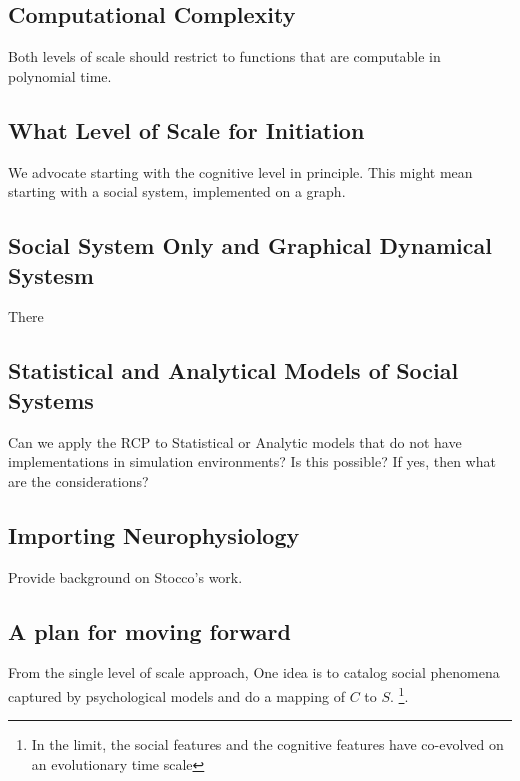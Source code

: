 \documentclass{article}
\begin{document}
\subsection{Computational Complexity}
Both levels of scale should restrict to functions that are computable in polynomial time.  

\subsection{What Level of Scale for Initiation}
We advocate starting with the cognitive level in principle.  This might mean starting with a social system, implemented on a graph. 

\subsection{Social System Only and Graphical Dynamical Systesm}
There 

\subsection{Statistical and Analytical Models of Social Systems}
Can we apply the RCP to Statistical or Analytic models that do not have implementations in simulation environments?  Is this possible?  If yes, then what are the considerations?

\subsection{Importing Neurophysiology}
Provide background on Stocco's work.

\subsection{A plan for moving forward}
From the single level of scale approach, One idea is to catalog social phenomena captured by psychological models and do a mapping of $C$ to $S$. \footnote{In the limit, the social features and the cognitive features have co-evolved on an evolutionary time scale}.
\end{document}
